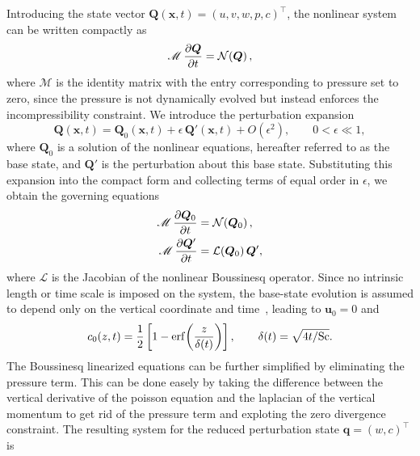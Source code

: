 Introducing the state vector \(\boldsymbol{Q}(\boldsymbol{x},t) = (u, v, w, p, c)^\top\), the nonlinear system can be written compactly as
\begin{equation}
    \label{eq:compact_nl_continuous}
    \mathscr{M}\,\frac{\partial \boldsymbol{Q}}{\partial t} = \mathcal{N}\!\left( \boldsymbol{Q} \right),
\end{equation}
where \(\mathscr{M}\) is the identity matrix with the entry corresponding to pressure set to zero, since the pressure is not dynamically evolved but instead enforces the incompressibility constraint.
We introduce the perturbation expansion
\begin{equation}
    \label{eq:perturbation_expansion}
    \boldsymbol{Q}(\boldsymbol{x},t) = \boldsymbol{Q}_0(\boldsymbol{x},t) + \epsilon\,\boldsymbol{Q}'(\boldsymbol{x},t) + O(\epsilon^2),
    \qquad 0 < \epsilon \ll 1,
\end{equation}
where \(\boldsymbol{Q}_0\) is a solution of the nonlinear equations, hereafter referred to as the base state, and \(\boldsymbol{Q}'\) is the perturbation about this base state. Substituting this expansion into the compact form and collecting terms of equal order in \(\epsilon\), we obtain the governing equations
\begin{subequations}
    \label{eq:compact_lin_continuous}
    \begin{align}
        \label{eq:compact_lin_continuous_0th}
        \mathscr{M}\,\frac{\partial \boldsymbol{Q}_0}{\partial t} &= \mathcal{N}\!\left( \boldsymbol{Q}_0 \right), \\
        \label{eq:compact_lin_continuous_1th}
        \mathscr{M}\,\frac{\partial \boldsymbol{Q}'}{\partial t} &= \mathcal{L}(\boldsymbol{Q}_0)\,\boldsymbol{Q}',
    \end{align}
\end{subequations}
where \(\mathcal{L}\) is the Jacobian of the nonlinear Boussinesq operator. Since no intrinsic length or time scale is imposed on the system, the base-state evolution is assumed to depend only on the vertical coordinate and time~\citep{prathama-pantano-2021}, leading to \(\boldsymbol{u}_0=0\) and
\begin{equation}
    \label{eq:bq_base_state}
    c_0(z,t) = \frac{1}{2}\left[1-\operatorname{erf}\!\left(\frac{z}{\delta(t)}\right)\right], \qquad \delta(t) = \sqrt{4t/\mathrm{Sc}}.
\end{equation}
The Boussinesq linearized equations can be further simplified by eliminating the pressure term. This can be done easely by taking the difference between the vertical derivative of the poisson equation and the laplacian of the vertical momentum to get rid of the pressure term and exploting the zero divergence constraint. The resulting system for the reduced perturbation state \(\boldsymbol{q}=(w,c)^{\top}\) is
